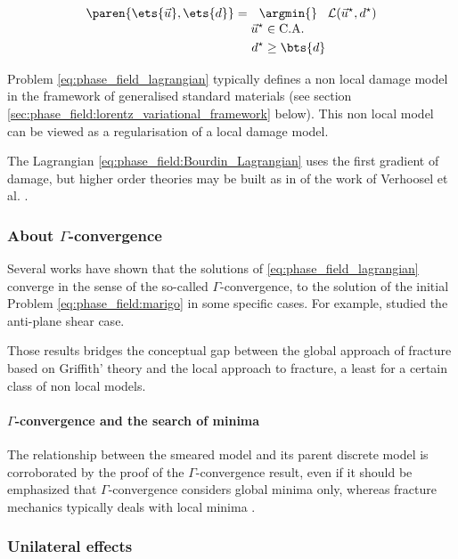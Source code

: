 \begin{equation}
    \label{eq:phase_field_lagrangian}
    \paren{\ets{\vec{u}},\ets{d}}=
    \underset{
    \begin{aligned}
    \vec{u}^{\star}&\in\text{C.A.}\\
    d^{\star}&\geq\bts{d}
    \end{aligned}
    }{\argmin{}}\,\mathcal{L}(\vec{u}^{\star},d^{\star})
\end{equation}

Problem \eqref{eq:phase_field_lagrangian} typically defines a non local damage
model in the framework of generalised standard materials (see section
\ref{sec:phase_field:lorentz_variational_framework} below). This non local
model can be viewed as a regularisation of a local damage model.

The Lagrangian \eqref{eq:phase_field:Bourdin_Lagrangian} uses the first
gradient of damage, but higher order theories may be built as in of the
work of Verhoosel et al. \cite{verhoosel_isogeometric_2011}.

\subsubsection{About \(\Gamma\)-convergence}

Several works have shown that the solutions of
\eqref{eq:phase_field_lagrangian} converge in the sense of the so-called
\(\Gamma\)-convergence, to the solution of the initial Problem
\eqref{eq:phase_field:marigo} in some specific cases. For example,
\cite{bourdin_numerical_2000} studied the anti-plane shear case.

Those results bridges the conceptual gap between the global approach of
fracture based on Griffith' theory and the local approach to fracture, a
least for a certain class of non local models.

\paragraph{\(\Gamma\)-convergence and the search of minima}

The relationship between the smeared model and its parent discrete
model is corroborated by the proof of the \(\Gamma\)-convergence result,
even if it should be emphasized that \(\Gamma\)-convergence considers
global minima only, whereas fracture mechanics typically deals
with local minima \cite{freddi_regularized_2010}.

\subsubsection{Unilateral effects}
\label{sec:phase_field:unilateral_effects}

